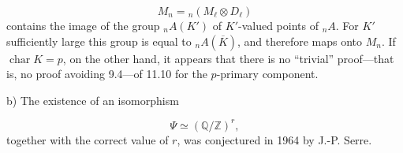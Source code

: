 \begin{equation*}
M_n={}_n(M_\ell\otimes D_\ell)
\end{equation*}
contains the image of the group ${}_nA(K')$ of $K'$-valued points of
${}_nA$. For $K'$ sufficiently large this group is equal to
${}_nA(\overline K)$, and therefore maps onto $M_n$. If
$\operatorname{char}K=p$, on the other hand, it appears that there is no
``trivial'' proof---that is, no proof avoiding 9.4---of 11.10 for the
$p$-primary component.

b) The existence of an isomorphism

\begin{equation*}
\Psi\simeq(\mathbb Q/\mathbb Z)^r,
\end{equation*}
together with the correct value of $r$, was conjectured in 1964 by
J.-P. Serre.
